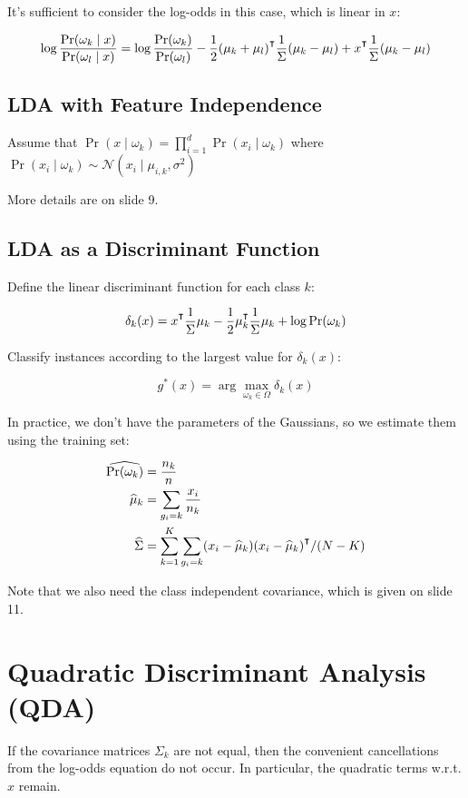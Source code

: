 \documentclass{idc_msc}
\renewcommand{\T}{{\mathpalette\raiseT\intercal}} %
\begin{document}
It's sufficient to consider the log-odds in this case, which is linear in \(x\):

\[\log \frac{\Pr(\omega_k \mid x)}{\Pr(\omega_l \mid x)} = \log \frac{\Pr(\omega_k)}{\Pr(\omega_l)} - \frac{1}{2}(\mu_k + \mu_l)^\T \frac{1}{\Sigma} (\mu_k - \mu_l) + x^\T \frac{1}{\Sigma}(\mu_k - \mu_l)\]

\subsection{LDA with Feature Independence}

Assume that \(\Pr(x \mid \omega_k) = \prod_{i=1}^d \Pr(x_i \mid \omega_k)\) where \(\Pr(x_i \mid \omega_k) \sim \mathcal{N}(x_i \mid \mu_{i,k}, \sigma^2)\)

More details are on slide 9.

\subsection{LDA as a Discriminant Function}

Define the linear discriminant function for each class \(k\):

\[\delta_k(x) = x^\T \frac{1}{\Sigma}\mu_k - \frac{1}{2}\mu_k^\T \frac{1}{\Sigma}\mu_k + \log \Pr(\omega_k)\]

Classify instances according to the largest value for \(\delta_k(x)\):

\[g^*(x) = \arg\max_{\omega_k \in \Omega} \delta_k(x)\]

In practice, we don't have the parameters of the Gaussians, so we estimate them using the training set:

\[
\begin{aligned}
\widehat{\Pr(\omega_k)} &= \frac{n_k}{n} \\
\widehat{\mu}_k &= \sum_{g_i=k} \frac{x_i}{n_k} \\
\widehat{\Sigma} &= \sum_{k=1}^{K} \sum_{g_i=k}(x_i - \widehat{\mu}_k)(x_i - \widehat{\mu}_k)^\T / (N - K)
\end{aligned}
\]

Note that we also need the class independent covariance, which is given on slide 11.

\section{Quadratic Discriminant Analysis (QDA)}

If the covariance matrices \(\Sigma_k\) are not equal, then the convenient cancellations from the log-odds equation do not occur.
In particular, the quadratic terms w.r.t. \(x\) remain.
\end{document}

